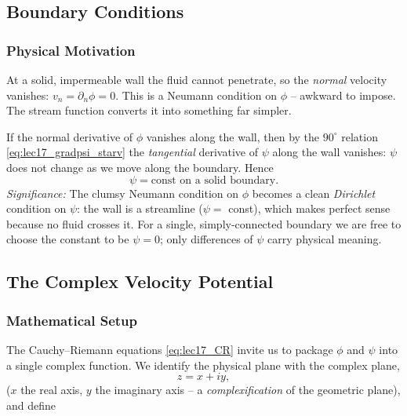 \documentclass[../main.tex]{subfiles}
\begin{document}

\subsection{Boundary Conditions}\label{sec:lec17:bc}

\subsubsection*{Physical Motivation}
At a solid, impermeable wall the fluid cannot penetrate, so the \emph{normal} velocity vanishes: $v_n=\partial_n\phi=0$. This is a Neumann condition on $\phi$ -- awkward to impose. The stream function converts it into something far simpler.

If the normal derivative of $\phi$ vanishes along the wall, then by the $90^\circ$ relation \eqref{eq:lec17_gradpsi_starv} the \emph{tangential} derivative of $\psi$ along the wall vanishes: $\psi$ does not change as we move along the boundary. Hence
\begin{equation}
  \boxed{\psi = \text{const on a solid boundary.}}
  \label{eq:lec17_bc_psi}
\end{equation}
\textit{Significance:} The clumsy Neumann condition on $\phi$ becomes a clean \emph{Dirichlet} condition on $\psi$: the wall is a streamline ($\psi=$ const), which makes perfect sense because no fluid crosses it. For a single, simply-connected boundary we are free to choose the constant to be $\psi=0$; only differences of $\psi$ carry physical meaning.

\subsection{The Complex Velocity Potential}\label{sec:lec17:complex}

\subsubsection*{Mathematical Setup}
The Cauchy--Riemann equations \eqref{eq:lec17_CR} invite us to package $\phi$ and $\psi$ into a single complex function. We identify the physical plane with the complex plane,
\begin{equation}
  z = x + iy,
  \label{eq:lec17_z}
\end{equation}
($x$ the real axis, $y$ the imaginary axis -- a \emph{complexification} of the geometric plane), and define
\end{document}
